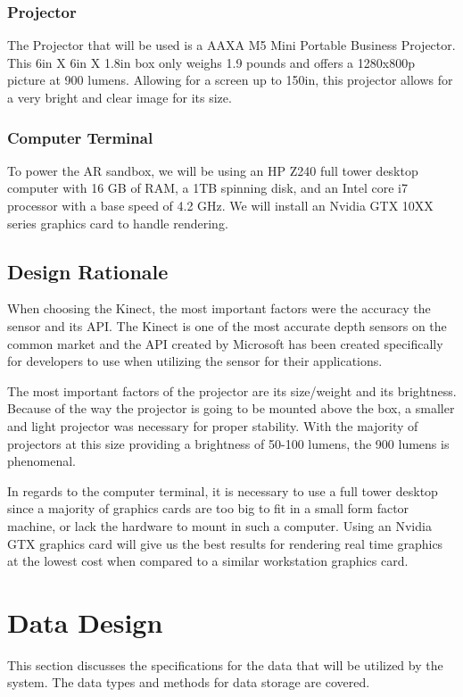 \documentclass[onecolumn, draftclsnofoot,10pt, compsoc]{IEEEtran}
\begin{document}
\subsubsection{Projector}

The Projector that will be used is a AAXA M5 Mini Portable Business Projector.
This 6in X 6in X 1.8in box only weighs 1.9 pounds and offers a 1280x800p picture at 900 lumens.
Allowing for a screen up to 150in, this projector allows for a very bright and clear image for its size.


\subsubsection{Computer Terminal}
To power the AR sandbox, we will be using an HP Z240 full tower desktop computer with 16 GB of RAM, a 1TB spinning disk, and an Intel core i7 processor with a base speed of 4.2 GHz. We will install an Nvidia GTX 10XX series graphics card to handle rendering.

\subsection{Design Rationale}

When choosing the Kinect, the most important factors were the accuracy the sensor and its API.
The Kinect is one of the most accurate depth sensors on the common market and the API created by Microsoft has been created specifically for developers to use when utilizing the sensor for their applications.

The most important factors of the projector are its size/weight and its brightness.
Because of the way the projector is going to be mounted above the box, a smaller and light projector was necessary for proper stability.
With the majority of projectors at this size providing a brightness of 50-100 lumens, the 900 lumens is phenomenal.

In regards to the computer terminal, it is necessary to use a full tower desktop since a majority of graphics cards are too big to fit in a small form factor machine, or lack the hardware to mount in such a computer. Using an Nvidia GTX graphics card will give us the best results for rendering real time graphics at the lowest cost when compared to a similar workstation graphics card.

\section{Data Design} %
This section discusses the specifications for the data that will be utilized by the system. The data types and methods for data storage are covered.
\end{document}
